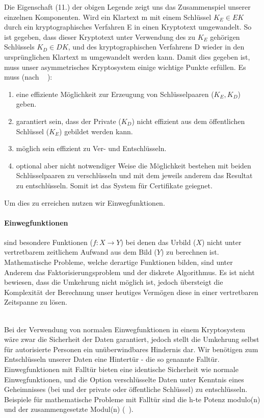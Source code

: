 \documentclass[paper=a4,11pt,german]{scrartcl} %
\begin{document}
Die Eigenschaft (11.) der obigen Legende zeigt uns das Zusammenspiel unserer einzelnen Komponenten. Wird ein Klartext m mit einem Schlüssel $K_E \in EK$ durch ein kryptographisches Verfahren E in einen Kryptotext umgewandelt. So ist gegeben, dass dieser Kryptotext unter Verwendung des zu $K_E$ gehörigen Schlüssels $K_D \in DK$, und des kryptographischen Verfahrens D wieder in den ursprünglichen Klartext m umgewandelt werden kann. Damit dies gegeben ist, muss unser asymmetrisches Kryptosystem einige wichtige Punkte erfüllen.
Es muss (nach ~\cite{Eckert13} ):
\newpage
\begin{enumerate}
\item eine effiziente Möglichkeit zur Erzeugung von Schlüsselpaaren ($K_E,K_D$) geben.
\item garantiert sein, dass der Private ($K_D$) nicht effizient aus dem öffentlichen Schlüssel ($K_E$) gebildet werden kann.
\item möglich sein effizient zu Ver- und Entschlüsseln.
\item optional aber nicht notwendiger Weise die Möglichkeit bestehen mit beiden Schlüsselpaaren zu verschlüsseln und mit dem jeweils anderem das Resultat zu entschlüsseln. Somit ist das System für Certifikate geiegnet.
\end{enumerate}

Um dies zu erreichen nutzen wir Einwegfunktionen.
\paragraph{Einwegfunktionen}
 sind besondere Funktionen ($f: X \rightarrow Y$) bei denen das Urbild ($X$) nicht unter vertretbarem zeitlichem Aufwand aus dem Bild ($Y$) zu berechnen ist. Mathematische Probleme, welche derartige Funktionen bilden, sind unter Anderem das Faktorisierungsproblem und der diskrete Algorithmus. Es ist nicht bewiesen, dass die Umkehrung nicht möglich ist, jedoch übersteigt die Komplexität der Berechnung unser heutiges Vermögen diese in einer vertretbaren Zeitspanne zu lösen.

\ \\
Bei der Verwendung von normalen Einwegfunktionen in einem Kryptosystem wäre zwar die Sicherheit der Daten garantiert, jedoch stellt die Umkehrung selbst für autorisierte Personen ein unüberwindbares Hindernis dar. Wir benötigen zum Entschlüsseln unserer Daten eine Hintertür - die so genannte Falltür. Einwegfunktionen mit Falltür bieten eine identische Sicherheit wie normale Einwegfunktionen, und die Option verschlüsselte Daten unter Kenntnis eines Geheimnisses (bei und der private oder öffentliche Schlüssel) zu entschlüsseln. Beispiele für mathematische Probleme mit Falltür sind die h-te Potenz modulo(n) und der zusammengesetzte Modul(n) (~\cite{Eckert13}). 
\end{document}
